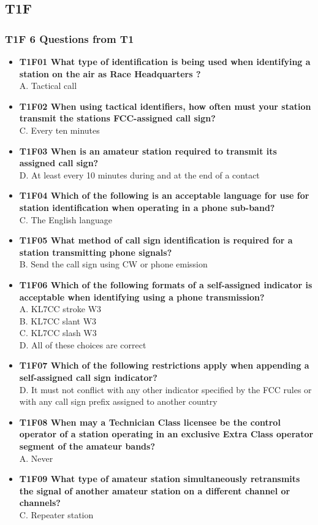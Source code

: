 \documentclass[10pt]{beamer}
\begin{document}
\subsection{T1F}
\begin{frame}
\frametitle{T1F 6 Questions from T1}
\begin{itemize}[<+->]
\tiny
\item\textbf{T1F01 What type of identification is being used when identifying a station on the air as Race Headquarters ?}\hfil\\ A. Tactical call
\item\textbf{T1F02 When using tactical identifiers, how often must your station transmit the stations FCC-assigned call sign?} \hfil\\C. Every ten minutes
\item\textbf{T1F03 When is an amateur station required to transmit its assigned call sign?}\hfil\\D. At least every 10 minutes during and at the end of a contact
\item\textbf{T1F04 Which of the following is an acceptable language for use for station identification when operating in a phone sub-band?} \hfil\\C. The English language
\item\textbf{T1F05 What method of call sign identification is required for a station transmitting phone signals?} \hfil\\B. Send the call sign using CW or phone emission
\item\textbf{T1F06 Which of the following formats of a self-assigned indicator is acceptable when identifying using a phone transmission?}\hfil\\A. KL7CC stroke W3\\B. KL7CC slant W3\\C. KL7CC slash W3\\D. All of these choices are correct
\item\textbf{T1F07  Which of the following restrictions apply when appending a self-assigned call sign indicator?} \hfil\\D. It must not conflict with any other indicator specified by the FCC rules or with any call sign prefix assigned to another country
\item\textbf{T1F08 When may a Technician Class licensee be the control operator of a station operating in an exclusive Extra Class operator segment of the amateur bands?} \hfil\\A. Never
\item\textbf{T1F09 What type of amateur station simultaneously retransmits the signal of another amateur station on a different channel or channels?} \hfil\\C. Repeater station

\end{itemize}
\end{frame}
\end{document}
